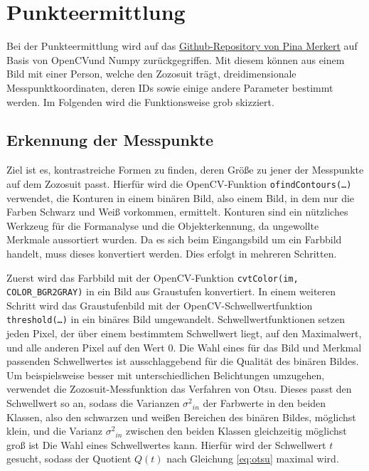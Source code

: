 \chapter{Punkteermittlung}

Bei der Punkteermittlung wird auf das \href{https://github.com/pinae/Zozo-Measurer}{Github-Repository von Pina Merkert} auf Basis von
OpenCVund Numpy zurückgegriffen. Mit diesem können aus einem Bild mit einer Person, welche den Zozosuit trägt,
dreidimensionale Messpunktkoordinaten, deren IDs sowie einige andere Parameter bestimmt werden. Im Folgenden
wird die Funktionsweise grob skizziert.

\section{Erkennung der Messpunkte}
Ziel ist es, kontrastreiche Formen zu finden, deren Größe zu jener der Messpunkte auf dem Zozosuit passt. Hierfür wird die OpenCV-Funktion
\texttt{ofindContours(\dots)} verwendet, die Konturen in einem binären Bild, also einem Bild, in dem
nur die Farben Schwarz und Weiß vorkommen, ermittelt. Konturen sind ein nützliches Werkzeug für die Formanalyse und die Objekterkennung, da
ungewollte Merkmale aussortiert wurden. Da es sich beim Eingangsbild um ein Farbbild handelt,
muss dieses konvertiert werden. Dies erfolgt in mehreren Schritten. 

Zuerst wird das Farbbild mit der OpenCV-Funktion \texttt{cvtColor(im, COLOR\_BGR2GRAY)}
in ein Bild aus Graustufen konvertiert. In einem weiteren Schritt wird das Graustufenbild mit der OpenCV-Schwellwertfunktion \texttt{threshold(\dots)} in
ein binäres Bild umgewandelt. Schwellwertfunktionen setzen jeden Pixel, der über einem 
bestimmtem Schwellwert liegt, auf den Maximalwert, und alle anderen Pixel auf den Wert $0$. Die
Wahl eines für das Bild und Merkmal passenden Schwellwertes ist ausschlaggebend für die Qualität des binären Bildes.
Um beispielsweise besser mit unterschiedlichen Belichtungen umzugehen, verwendet die Zozosuit-Messfunktion
das Verfahren von Otsu. Dieses passt den Schwellwert so an, sodass die Varianzen ${\sigma^2}_{in}$ der Farbwerte in den beiden Klassen,
also den schwarzen und weißen Bereichen des binären Bildes, möglichst klein, und die Varianz ${\sigma^2}_{in}$ zwischen den beiden Klassen gleichzeitig möglichst groß ist 
Die Wahl eines Schwellwertes kann. Hierfür wird der Schwellwert $t$ gesucht, sodass der Quotient $Q(t)$ nach Gleichung 
\ref{eq:otsu} maximal wird. \cite{Opencv:2013}

